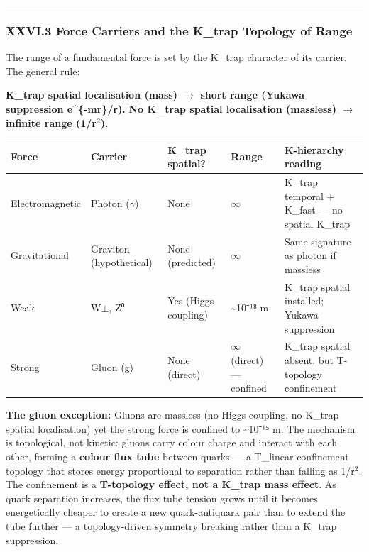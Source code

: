 \documentclass[12pt,a4paper]{article}
\begin{document}
\begin{center}
\rule{0.5\textwidth}{0.4pt}
\end{center}

\subsubsection{XXVI.3 Force Carriers and the K\_trap Topology of Range}

The range of a fundamental force is set by the K\_trap character of its carrier. The general rule:

\textbf{K\_trap spatial localisation (mass) $\rightarrow$ short range (Yukawa suppression e\^{}\{-mr\}/r).}
\textbf{No K\_trap spatial localisation (massless) $\rightarrow$ infinite range (1/r$^{2}$).}

\begin{table}[htbp]
\centering
\small
{}
\begin{tabularx}{\textwidth}{>{\centering\arraybackslash}X >{\centering\arraybackslash}X >{\centering\arraybackslash}X >{\centering\arraybackslash}X >{\centering\arraybackslash}X}
\toprule
\rowcolor{gray!25}\textbf{Force} & \textbf{Carrier} & \textbf{K\_trap spatial?} & \textbf{Range} & \textbf{K-hierarchy reading} \\
\midrule
\rowcolors{1}{white}{gray!10}
Electromagnetic & Photon ($\gamma$) & None & $\infty$ & K\_trap temporal + K\_fast --- no spatial K\_trap \\
Gravitational & Graviton (hypothetical) & None (predicted) & $\infty$ & Same signature as photon if massless \\
Weak & W$\pm$, Z⁰ & Yes (Higgs coupling) & \textasciitilde{}10⁻¹⁸ m & K\_trap spatial installed; Yukawa suppression \\
Strong & Gluon (g) & None (direct) & $\infty$ (direct) --- confined & K\_trap spatial absent, but T-topology confinement \\
\bottomrule
\end{tabularx}
\end{table}

\textbf{The gluon exception:} Gluons are massless (no Higgs coupling, no K\_trap spatial localisation) yet the strong force is confined to \textasciitilde{}10⁻¹⁵ m. The mechanism is topological, not kinetic: gluons carry colour charge and interact with each other, forming a \textbf{colour flux tube} between quarks --- a T\_linear confinement topology that stores energy proportional to separation rather than falling as 1/r$^{2}$. The confinement is a \textbf{T-topology effect, not a K\_trap mass effect}. As quark separation increases, the flux tube tension grows until it becomes energetically cheaper to create a new quark-antiquark pair than to extend the tube further --- a topology-driven symmetry breaking rather than a K\_trap suppression.
\end{document}
